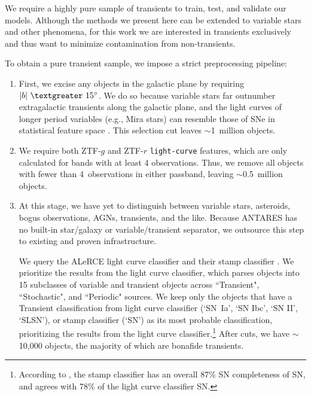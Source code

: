 \documentclass[twocolumn]{aastex63}
\begin{document}
We require a highly pure sample of transients to train, test, and validate our models. Although the methods we present here can be extended to variable stars and other phenomena, for this work we are interested in transients exclusively and thus want to minimize contamination from non-transients. \par

To obtain a pure transient sample, we impose a strict preprocessing pipeline: 
\begin{enumerate}
    \item First, we excise any objects in the galactic plane by requiring $|b|~\textgreater~15\degree$. We do so because variable stars far outnumber extragalactic transients along the galactic plane, and the light curves of longer period variables (e.g., Mira stars) can resemble those of SNe in statistical feature space \citep{Malanchev2021, Aleo2022}. This selection cut leaves $\sim$1~million objects.
    \item We require both ZTF-$g$ and ZTF-$r$ \texttt{light-curve} features, which are only calculated for bands with at least 4 observations. Thus, we remove all objects with fewer than 4~observations in either passband, leaving $\sim$0.5~million objects.
    \item At this stage, we have yet to distinguish between variable stars, asteroids, bogus observations, AGNs, transients, and the like. Because ANTARES has no built-in star/galaxy or variable/transient separator, we outsource this step to existing and proven infrastructure. \par
    We query the ALeRCE light curve classifier \citep{SanchezSaez2021} and their stamp classifier \citep{Carrasco-Davis2021}. We prioritize the results from the light curve classifier, which parses objects into 15 subclasses of variable and transient objects across ``Transient", ``Stochastic", and ``Periodic" sources. We keep only the objects that have a Transient classification from light curve classifier (`SN~Ia', `SN Ibc', `SN II', `SLSN'), or stamp classifier (`SN') as its most probable classification, prioritizing the results from the light curve classifier.\footnote{According to \cite{Carrasco-Davis2021}, the stamp classifier has an overall 87\% SN completeness of SN, and agrees with 78\% of the light curve classifier SN.} After cuts, we have $\sim$10,000 objects, the majority of which are bonafide transients.

\end{enumerate}
\end{document}
